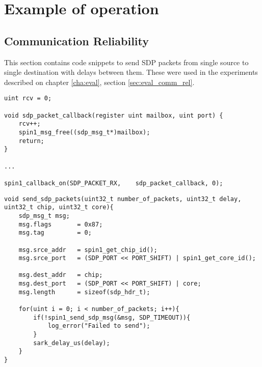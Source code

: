\chapter{Example of operation}

\section{Communication Reliability}
\label{sec:appendix_comm_rel}

This section contains code snippets to send SDP packets from single source to single destination with delays between them. These were used in the experiments described on chapter \ref{cha:eval}, section \ref{sec:eval_comm_rel}.

\begin{lstlisting}[caption={Source}]
uint rcv = 0;

void sdp_packet_callback(register uint mailbox, uint port) {
    rcv++;
    spin1_msg_free((sdp_msg_t*)mailbox);
    return;
}

...

spin1_callback_on(SDP_PACKET_RX,    sdp_packet_callback, 0);

\end{lstlisting}

\begin{lstlisting}[caption={Destination}]
void send_sdp_packets(uint32_t number_of_packets, uint32_t delay, uint32_t chip, uint32_t core){
	sdp_msg_t msg;
    msg.flags       = 0x87;
    msg.tag         = 0;

    msg.srce_addr   = spin1_get_chip_id();
    msg.srce_port   = (SDP_PORT << PORT_SHIFT) | spin1_get_core_id();

    msg.dest_addr   = chip;
    msg.dest_port   = (SDP_PORT << PORT_SHIFT) | core;
    msg.length 		= sizeof(sdp_hdr_t);

    for(uint i = 0; i < number_of_packets; i++){
    	if(!spin1_send_sdp_msg(&msg, SDP_TIMEOUT)){
        	log_error("Failed to send");
        }
        sark_delay_us(delay);
    }
}
\end{lstlisting}
